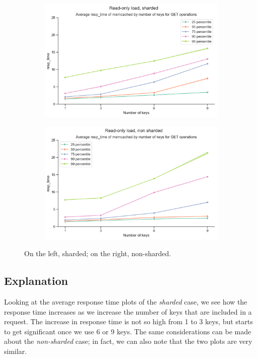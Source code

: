\documentclass[11pt,a4paper]{article}
\begin{document}
\begin{figure}[H]
	\begin{subfigure}[b]{0.5\linewidth}
		\includegraphics[width=\linewidth]{images/gets_2/last_graph_get_resp_time.pdf}
	\end{subfigure}
	\begin{subfigure}[b]{0.5\linewidth}
		\includegraphics[width=\linewidth]{images/gets_1/last_graph_get_resp_time.pdf}
	\end{subfigure}
	\caption{On the left, sharded; on the right, non-sharded.}
	\label{fig:percentiles}
\end{figure}


\subsection{Explanation}

Looking at the average response time plots of the \emph{sharded} case, 
we see how the response time increases as we increase the number of
keys that are included in a request. The increase in response time
is not so high from 1 to 3 keys, but starts to get significant 
once we use 6 or 9 keys.
The same considerations can be made about the \emph{non-sharded} case;
in fact, we can also note that the two plots are very similar.
\end{document}
